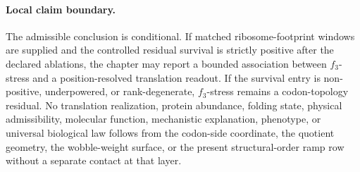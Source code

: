 \paragraph{Local claim boundary.}
The admissible conclusion is conditional. If matched ribosome-footprint windows are supplied and the controlled residual survival is strictly positive after the declared ablations, the chapter may report a bounded association between $f_3$-stress and a position-resolved translation readout. If the survival entry is non-positive, underpowered, or rank-degenerate, $f_3$-stress remains a codon-topology residual. No translation realization, protein abundance, folding state, physical admissibility, molecular function, mechanistic explanation, phenotype, or universal biological law follows from the codon-side coordinate, the quotient geometry, the wobble-weight surface, or the present structural-order ramp row without a separate contact at that layer.

